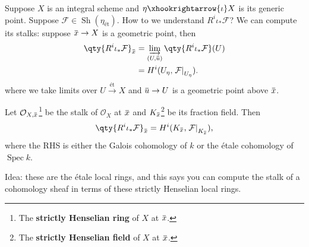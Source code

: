 \begin{example}[?]

Suppose \(X\) is an integral scheme and
\(\eta\xhookrightarrow{\iota} X\) is its generic point. Suppose
\(\mathcal{F}\in {\operatorname{Sh}}(\eta_\text{ét})\). How to we
understand \(R^i \iota_* \mathcal{F}\)? We can compute its stalks:
suppose
\(\mkern 1.5mu\overline{\mkern-1.5mux\mkern-1.5mu}\mkern 1.5mu \to X\)
is a geometric point, then
\begin{align*}  
\qty{R^i \iota_* \mathcal{F}}_{\mkern 1.5mu\overline{\mkern-1.5mux\mkern-1.5mu}\mkern 1.5mu} 
&= 
\varinjlim_{(U, \mkern 1.5mu\overline{\mkern-1.5muu\mkern-1.5mu}\mkern 1.5mu)} \qty{R^i \iota_* \mathcal{F}}(U) \\
&=
H^i(U_\eta, { \left.{{\mathcal{F}}} \right|_{{U_\eta}} })
.\end{align*}
where we take limits over \(U\xrightarrow{\text{ét}} X\) and
\(\mkern 1.5mu\overline{\mkern-1.5muu\mkern-1.5mu}\mkern 1.5mu\to U\) is
a geometric point above
\(\mkern 1.5mu\overline{\mkern-1.5mux\mkern-1.5mu}\mkern 1.5mu\).

\end{example}

\begin{exercise}

Let
\({\mathcal{O}}_{X, \mkern 1.5mu\overline{\mkern-1.5mux\mkern-1.5mu}\mkern 1.5mu}\)\footnote{The
  \textbf{strictly Henselian ring} of \(X\) at
  \(\mkern 1.5mu\overline{\mkern-1.5mux\mkern-1.5mu}\mkern 1.5mu\).} be
the stalk of \({\mathcal{O}}_X\) at
\(\mkern 1.5mu\overline{\mkern-1.5mux\mkern-1.5mu}\mkern 1.5mu\) and
\(K_{\mkern 1.5mu\overline{\mkern-1.5mux\mkern-1.5mu}\mkern 1.5mu}\)\footnote{The
  \textbf{strictly Henselian field} of \(X\) at
  \(\mkern 1.5mu\overline{\mkern-1.5mux\mkern-1.5mu}\mkern 1.5mu\).} be
its fraction field. Then
\begin{align*}  
\qty{R^i \iota_* \mathcal{F}}_{\mkern 1.5mu\overline{\mkern-1.5mux\mkern-1.5mu}\mkern 1.5mu}
=
H^i(K_{\mkern 1.5mu\overline{\mkern-1.5mux\mkern-1.5mu}\mkern 1.5mu}, { \left.{{\mathcal{F}}} \right|_{{K_{\mkern 1.5mu\overline{\mkern-1.5mux\mkern-1.5mu}\mkern 1.5mu}}} } )
,\end{align*}
where the RHS is either the Galois cohomology of \(k\) or the étale
cohomology of \(\operatorname{Spec}k\).

\end{exercise}

Idea: these are the étale local rings, and this says you can compute the
stalk of a cohomology sheaf in terms of these strictly Henselian local
rings.

